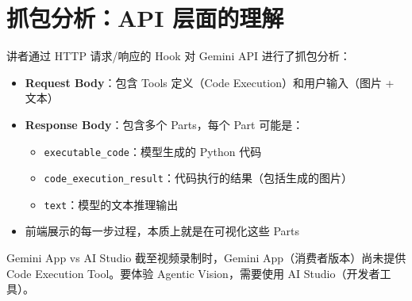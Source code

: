 \section{抓包分析：API 层面的理解}

讲者通过 HTTP 请求/响应的 Hook 对 Gemini API 进行了抓包分析：

\begin{itemize}
    \item \textbf{Request Body}：包含 Tools 定义（Code Execution）和用户输入（图片 + 文本）
    \item \textbf{Response Body}：包含多个 Parts，每个 Part 可能是：
    \begin{itemize}
        \item \texttt{executable\_code}：模型生成的 Python 代码
        \item \texttt{code\_execution\_result}：代码执行的结果（包括生成的图片）
        \item \texttt{text}：模型的文本推理输出
    \end{itemize}
    \item 前端展示的每一步过程，本质上就是在可视化这些 Parts
\end{itemize}

\begin{knowledgebox}{Gemini App vs AI Studio}
截至视频录制时，Gemini App（消费者版本）尚未提供 Code Execution Tool。要体验 Agentic Vision，需要使用 AI Studio（开发者工具）。
\end{knowledgebox}


